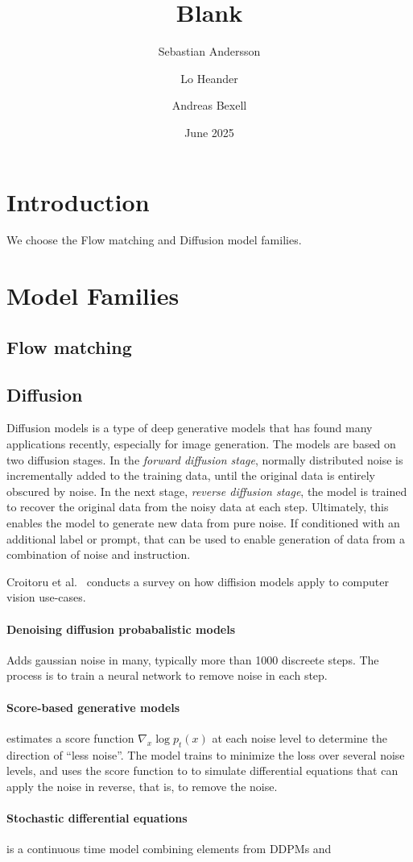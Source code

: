\documentclass{article}
\title{Blank}
\author{Sebastian Andersson \and Lo Heander \and Andreas Bexell}
\date{June 2025}
\begin{document}
\maketitle

\section{Introduction}

We choose the Flow matching and Diffusion model families. 

\section{Model Families}

\subsection{Flow matching}

\subsection{Diffusion}

Diffusion models is a type of deep generative models that has found many applications recently, especially for image generation. The models are based on two diffusion stages. In the \emph{forward diffusion stage}, normally distributed noise is incrementally added to the training data, until the original data is entirely obscured by noise. In the next stage, \emph{reverse diffusion stage}, the model is trained to recover the original data from the noisy data at each step. Ultimately, this enables the model to generate new data from pure noise. If conditioned with an additional label or prompt, that can be used to enable generation of data from a combination of noise and instruction.

Croitoru et al.~\cite{croitoru2023diffusion} conducts a survey on how diffision models apply to computer vision use-cases.

\paragraph{Denoising diffusion probabalistic models} Adds gaussian noise in many, typically more than 1000 discreete steps. The process is to train a neural network to remove noise in each step.

\paragraph{Score-based generative models} estimates a score function $\nabla_x \log p_t(x)$ at each noise level to determine the direction of ``less noise''. The model trains to minimize the loss over several noise levels, and uses the score function to to simulate differential equations that can apply the noise in reverse, that is, to remove the noise.

\paragraph{Stochastic differential equations} is a continuous time model combining elements from DDPMs and 



\end{document}
